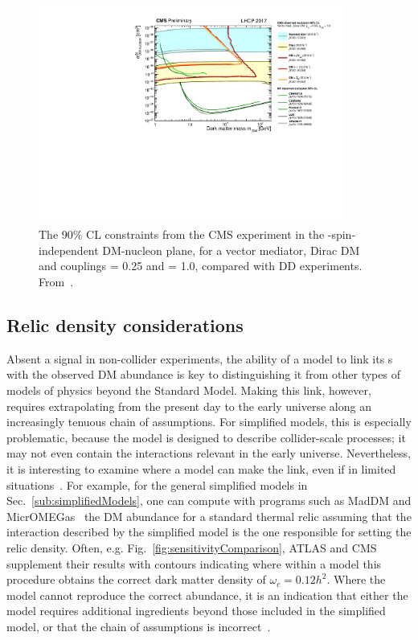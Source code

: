 \begin{figure}[!htpb]
\includegraphics[width=0.9\textwidth]{figures/SI_CMSDD_Summary}
\caption{The 90\% CL constraints from the CMS experiment in the \mdm-spin-independent DM-nucleon plane, for a vector mediator, Dirac DM and couplings \gq = 0.25 and \gdm = 1.0, compared with DD experiments. From~\cite{CMSSummary}.}
\label{fig:SICMS}
\end{figure}

\subsection{Relic density considerations}
Absent a signal in non-collider experiments, the ability of a model to link its {\IP}s with the observed DM abundance is key to distinguishing it from other types of models of physics beyond the Standard Model.
Making this link, however, requires extrapolating from the present day to the early universe along an increasingly tenuous chain of assumptions.
For simplified models, this is especially problematic, because the model is designed to describe collider-scale processes; it may not even contain the interactions relevant in the early universe.
Nevertheless, it is interesting to examine where a model can make the link, even if in limited situations~\cite{Busoni:2014gta,Catena:2017xqq}.
For example, for the general simplified models in Sec.~\ref{sub:simplifiedModels}, one can compute with programs such as MadDM and MicrOMEGas~\cite{Backovic:2015cra,Barducci:2016pcb} the DM abundance for a standard thermal relic assuming that the interaction described by the simplified model is the one responsible for setting the relic density.
Often, e.g. Fig.~\ref{fig:sensitivityComparison}, ATLAS and CMS supplement their results with contours indicating where within a model this procedure obtains the correct dark matter density of $\omega_c = 0.12 h^2$.
Where the model cannot reproduce the correct abundance, it is an indication that either the model requires additional ingredients beyond those included in the simplified model, or that the chain of assumptions is incorrect~\cite{Bernal:2017kxu}.
